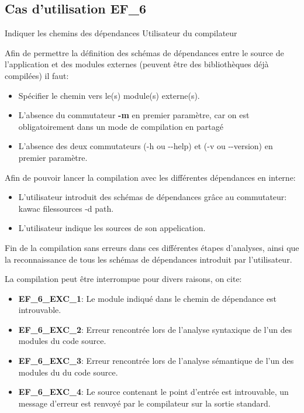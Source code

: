 \subsection{Cas d'utilisation EF\_6}
\fiche
{Indiquer les chemins des dépendances}          %
{Utilisateur du compilateur}                               %
{                                                %
	Afin de permettre la définition  des schémas de dépendances entre le source de l'application et des modules externes (peuvent être des bibliothèques déjà compilées) il faut:   
	\begin{itemize}
  	\item Spécifier le chemin vers le(s) module(s) externe(s).
  	\item L'absence du commutateur  \textbf {-m}  en premier paramètre, car on est obligatoirement dans un mode de compilation en partagé
  	\item L'absence des deux commutateurs (-h ou -\hspace{0.1mm}-help) et (-v ou -\hspace{0.1mm}-version) en premier paramètre.
  	\end {itemize}
}
{
  
}                                                %
{ 
	Afin de pouvoir lancer la compilation avec les différentes dépendances en interne:
	\begin{itemize}
  	\item L'utilisateur introduit des schémas de dépendances grâce au commutateur: kawac filessources -d path.
  	\item L'utilisateur indique les sources de son appelication.
  	\end {itemize}

}                             %
{Fin de la compilation sans erreurs dans ces différentes étapes d'analyses, ainsi que la reconnaissance de tous les schémas de dépendances introduit par l'utilisateur.}                       %
{                                                %
 
}{} %
{
La compilation peut être interrompue pour divers raisons, on cite:
	\begin{itemize}
  	\item \textbf {EF\_6\_EXC\_1}: Le module indiqué dans le chemin de dépendance est introuvable.
  	\item \textbf {EF\_6\_EXC\_2}: Erreur rencontrée lors de l'analyse syntaxique de l'un des modules du code source.
  	\item \textbf {EF\_6\_EXC\_3}: Erreur rencontrée lors de l'analyse sémantique de l'un des modules du du code source.
  	\item \textbf {EF\_6\_EXC\_4}: Le source contenant le point d'entrée est introuvable, un message d'erreur est renvoyé par le compilateur sur la sortie standard.
  	\end {itemize}
} %

